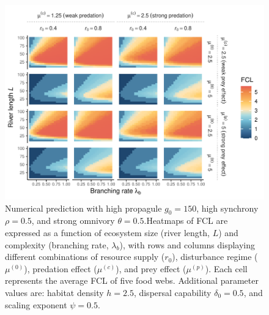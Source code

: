 \begin{figure}
\centering
\includegraphics{../data_fmt/fig_rho05_g150_theta05.pdf}
\caption{\label{fig:fig-num8}Numerical prediction with high propagule
\(g_0 = 150\), high synchrony \(\rho = 0.5\), and strong omnivory
\(\theta = 0.5\).Heatmaps of FCL are expressed as a function of
ecosystem size (river length, \(L\)) and complexity (branching rate,
\(\lambda_b\)), with rows and columns displaying different combinations
of resource supply (\(r_0\)), disturbance regime (\(\mu^{(0)}\)),
predation effect (\(\mu^{(c)}\)), and prey effect (\(\mu^{(p)}\)). Each
cell represents the average FCL of five food webs. Additional parameter
values are: habitat density \(h=2.5\), dispersal capability
\(\delta_0=0.5\), and scaling exponent \(\psi=0.5\).}
\end{figure}

\newpage
